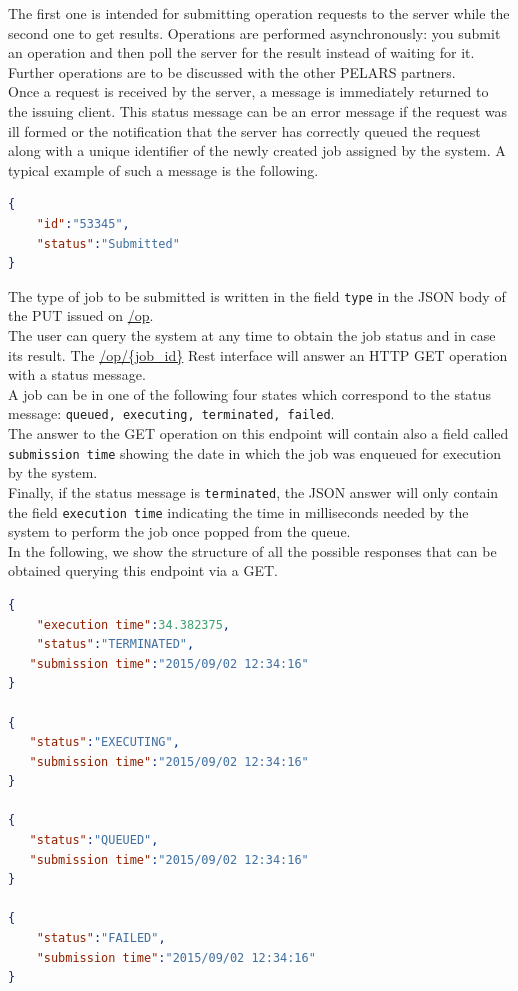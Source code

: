 \documentclass[a4paper,notitlepage,onecolumn]{hitec}  %
\begin{document}
The first one is intended for submitting operation requests to the server while the second one to get results.
Operations are performed asynchronously: you submit an operation and then poll the server for the result instead of waiting for it. Further operations are to be discussed with the other PELARS partners.\\
Once a request is received by the server,  a message is immediately returned to the issuing client. This status message can be an error message if the request was ill formed or the notification that the server has correctly queued the request along with a unique identifier of the newly created job assigned by the system. A typical example of such a message is the following.

\begin{lstlisting}[language=json,firstnumber=1]
{  
	"id":"53345",
	"status":"Submitted"
}
\end{lstlisting}
The type of job to be submitted is written in the field {\tt type} in the JSON body of the PUT issued on \url{/op}. \\
The user can query the system at any time to obtain the job status and in case its result. 
The \url{/op/{job\_id}} Rest interface will answer an HTTP GET operation with a status message. \\
A job can be in one of the following four states which correspond to the status message: {\tt queued, executing, terminated, failed}. \\
The answer to the GET operation on this endpoint will contain also a field called {\tt submission time} showing the date in which the job was enqueued for execution by the system.\\
Finally, if the status message is {\tt terminated}, the JSON answer will only contain the field {\tt execution time} indicating the time in milliseconds needed by the system to perform the job once popped from the queue.\\ In the following, we show the structure of all the possible responses that can be obtained querying this endpoint via a GET.
\begin{lstlisting}[language=json,firstnumber=1]
{  
	"execution time":34.382375,
	"status":"TERMINATED",
   "submission time":"2015/09/02 12:34:16"
}

{  
   "status":"EXECUTING",
   "submission time":"2015/09/02 12:34:16"
}

{  
   "status":"QUEUED",
   "submission time":"2015/09/02 12:34:16"
}

{  
	"status":"FAILED",
	"submission time":"2015/09/02 12:34:16"
}
\end{lstlisting}
\end{document}
